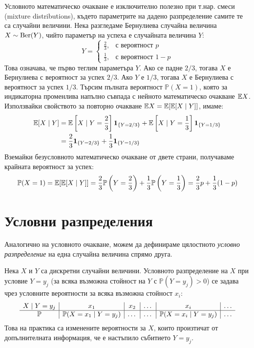 \begin{example}\label{ex:08-1}

Условното математическо очакване е изключително полезно при т.нар. смеси (mixture distributions), където параметрите на дадено разпределение самите те са случайни величини. Нека разгледаме Бернулиева случайна величина $X \sim \operatorname{Ber}(Y)$, чийто параметър на успеха е случайната величина $Y$:
\[
Y = \begin{cases}
\frac{2}{3}, & \text{с вероятност } p \\
\frac{1}{3}, & \text{с вероятност } 1-p
\end{cases}
\]
Това означава, че първо теглим параметъра $Y$. Ако се падне $2/3$, тогава $X$ е Бернулиева с вероятност за успех $2/3$. Ако $Y$ е $1/3$, тогава $X$ е Бернулиева с вероятност за успех $1/3$. Търсим пълната вероятност $\mathbb{P}(X=1)$, която за индикаторна променлива напълно съвпада с нейното математическо очакване $\mathbb{E} X$. Използвайки свойството за повторно очакване $\mathbb{E} X = \mathbb{E}[\mathbb{E}[X \mid Y]]$, имаме:
\begin{align*}
\mathbb{E}[X \mid Y] &= \mathbb{E}\left[X \mid Y=\frac{2}{3}\right] \mathbf{1}_{\{Y=2/3\}} + \mathbb{E}\left[X \mid Y=\frac{1}{3}\right] \mathbf{1}_{\{Y=1/3\}} \\
&= \frac{2}{3} \mathbf{1}_{\{Y=2/3\}} + \frac{1}{3} \mathbf{1}_{\{Y=1/3\}}
\end{align*}
Вземайки безусловното математическо очакване от двете страни, получаваме крайната вероятност за успех:
\[
\mathbb{P}(X=1) = \mathbb{E}[\mathbb{E}[X \mid Y]] = \frac{2}{3} \mathbb{P}\left(Y=\frac{2}{3}\right) + \frac{1}{3} \mathbb{P}\left(Y=\frac{1}{3}\right) = \frac{2}{3}p + \frac{1}{3}(1-p)
\]

\end{example}

\section{Условни разпределения}

Аналогично на условното очакване, можем да дефинираме цялостното \emph{условно разпределение} на една случайна величина спрямо друга.

\begin{defn}
Нека $X$ и $Y$ са дискретни случайни величини. Условното разпределение на $X$ при условие $Y=y_j$ (за всяка възможна стойност на $Y$ с $\mathbb{P}(Y=y_j)>0$) се задава чрез условните вероятности за всяка възможна стойност $x_i$:
\[
\begin{array}{c|c|c|c|c|c}
X \mid Y=y_j & x_1 & x_2 & \dots & x_i & \dots \\
\hline
\mathbb{P} & \mathbb{P}(X=x_1 \mid Y=y_j) & \dots & \dots & \mathbb{P}(X=x_i \mid Y=y_j) & \dots
\end{array}
\]
Това на практика са изменените вероятности за $X$, които произтичат от допълнителната информация, че е настъпило събитието $Y=y_j$.
\end{defn}

